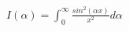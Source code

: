 \documentclass[preview]{standalone}
\begin{document}
\begin{align*}
I(\alpha) = \int_{0}^{\infty}\frac{sin^2(\alpha x)}{x^2}d\alpha
\end{align*}
\end{document}
